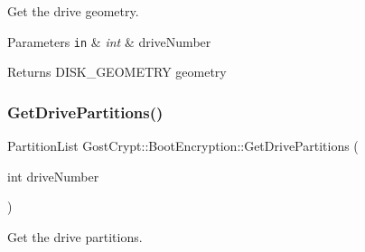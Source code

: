 Get the drive geometry. 


\begin{DoxyParams}[1]{Parameters}
\mbox{\tt in}  & {\em int} & drive\+Number \\
\hline
\end{DoxyParams}
\begin{DoxyReturn}{Returns}
D\+I\+S\+K\+\_\+\+G\+E\+O\+M\+E\+T\+RY geometry 
\end{DoxyReturn}
\mbox{\label{class_gost_crypt_1_1_boot_encryption_a3043ae06af0b4d63e45806ddc1458006}} 
\subsubsection{\texorpdfstring{Get\+Drive\+Partitions()}{GetDrivePartitions()}}
{\footnotesize\ttfamily Partition\+List Gost\+Crypt\+::\+Boot\+Encryption\+::\+Get\+Drive\+Partitions (\begin{DoxyParamCaption}\item[{int}]{drive\+Number }\end{DoxyParamCaption})\hspace{0.3cm}{\ttfamily [protected]}}



Get the drive partitions. 


